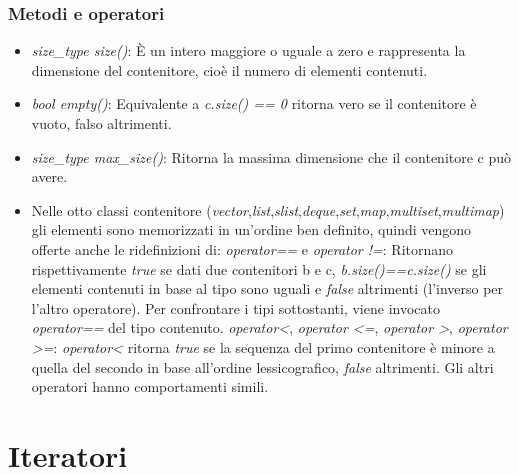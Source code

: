\subsubsection{Metodi e operatori}
\begin{itemize}
	\item \textit{size\_type size()}: \`{E} un intero maggiore o uguale a zero e rappresenta la dimensione del contenitore, cioè il numero di elementi contenuti.
	\item \textit{bool empty()}: Equivalente a \textit{c.size() == 0} ritorna vero se il contenitore è vuoto, falso altrimenti.
	\item \textit{size\_type max\_size()}: Ritorna la massima dimensione che il contenitore c può avere.
	\item Nelle otto classi contenitore (\textit{vector},\textit{list},\textit{slist},\textit{deque},\textit{set},\textit{map},\textit{multiset},\textit{multimap}) gli elementi sono memorizzati in un'ordine ben definito, quindi vengono offerte anche le ridefinizioni di:
	\subitem \textit{operator==} e \textit{operator !=}: Ritornano rispettivamente \textit{true} se dati due contenitori b e c, \textit{b.size()==c.size()} se gli elementi contenuti in base al tipo sono uguali e \textit{false} altrimenti (l'inverso per l'altro operatore). Per confrontare i tipi sottostanti, viene invocato \textit{operator==} del tipo contenuto.
	\subitem \textit{operator<}, \textit{operator <=}, \textit{operator >}, \textit{operator >=}: \textit{operator<} ritorna \textit{true} se la sequenza del primo contenitore è minore a quella del secondo in base all'ordine lessicografico, \textit{false} altrimenti. Gli altri operatori hanno comportamenti simili. 
\end{itemize}

\section{Iteratori}
